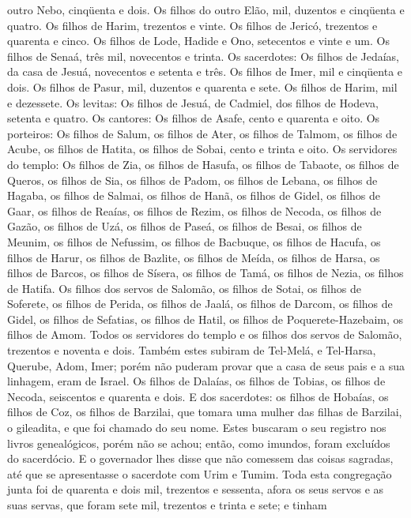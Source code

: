 outro Nebo, cinqüenta e dois. Os filhos do outro Elão, mil,
duzentos e cinqüenta e quatro. Os filhos de Harim, trezentos
e vinte. Os filhos de Jericó, trezentos e quarenta e cinco.
Os filhos de Lode, Hadide e Ono, setecentos e vinte e um.
Os filhos de Senaá, três mil, novecentos e trinta. Os
sacerdotes: Os filhos de Jedaías, da casa de Jesuá, novecentos e
setenta e três. Os filhos de Imer, mil e cinqüenta e dois.
Os filhos de Pasur, mil, duzentos e quarenta e sete.
Os filhos de Harim, mil e dezessete. Os levitas: Os
filhos de Jesuá, de Cadmiel, dos filhos de Hodeva, setenta e quatro.
Os cantores: Os filhos de Asafe, cento e quarenta e oito.
Os porteiros: Os filhos de Salum, os filhos de Ater, os
filhos de Talmom, os filhos de Acube, os filhos de Hatita, os filhos
de Sobai, cento e trinta e oito. Os servidores do templo: Os
filhos de Zia, os filhos de Hasufa, os filhos de Tabaote, os
filhos de Queros, os filhos de Sia, os filhos de Padom, os
filhos de Lebana, os filhos de Hagaba, os filhos de Salmai,
os filhos de Hanã, os filhos de Gidel, os filhos de Gaar,
os filhos de Reaías, os filhos de Rezim, os filhos de Necoda,
os filhos de Gazão, os filhos de Uzá, os filhos de Paseá,
os filhos de Besai, os filhos de Meunim, os filhos de
Nefussim, os filhos de Bacbuque, os filhos de Hacufa, os
filhos de Harur, os filhos de Bazlite, os filhos de Meída, os
filhos de Harsa, os filhos de Barcos, os filhos de Sísera, os
filhos de Tamá, os filhos de Nezia, os filhos de Hatifa.
Os filhos dos servos de Salomão, os filhos de Sotai, os
filhos de Soferete, os filhos de Perida, os filhos de Jaalá,
os filhos de Darcom, os filhos de Gidel, os filhos de
Sefatias, os filhos de Hatil, os filhos de Poquerete-Hazebaim, os
filhos de Amom. Todos os servidores do templo e os filhos dos
servos de Salomão, trezentos e noventa e dois. Também estes
subiram de Tel-Melá, e Tel-Harsa, Querube, Adom, Imer; porém não
puderam provar que a casa de seus pais e a sua linhagem, eram de
Israel. Os filhos de Dalaías, os filhos de Tobias, os filhos
de Necoda, seiscentos e quarenta e dois. E dos sacerdotes: os
filhos de Hobaías, os filhos de Coz, os filhos de Barzilai, que
tomara uma mulher das filhas de Barzilai, o gileadita, e que foi
chamado do seu nome. Estes buscaram o seu registro nos livros
genealógicos, porém não se achou; então, como imundos, foram
excluídos do sacerdócio. E o governador lhes disse que não
comessem das coisas sagradas, até que se apresentasse o sacerdote
com Urim e Tumim. Toda esta congregação junta foi de quarenta
e dois mil, trezentos e sessenta, afora os seus servos e as
suas servas, que foram sete mil, trezentos e trinta e sete; e tinham

